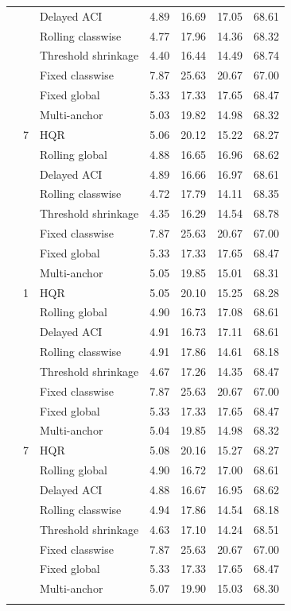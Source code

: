 \begin{table}[p]
\begin{tabular}{rrlrrrr}
 &  & Delayed ACI & 4.89 & 16.69 & 17.05 & 68.61 \\
 &  & Rolling classwise & 4.77 & 17.96 & 14.36 & 68.32 \\
 &  & Threshold shrinkage & 4.40 & 16.44 & 14.49 & 68.74 \\
 &  & Fixed classwise & 7.87 & 25.63 & 20.67 & 67.00 \\
 &  & Fixed global & 5.33 & 17.33 & 17.65 & 68.47 \\
 &  & Multi-anchor & 5.03 & 19.82 & 14.98 & 68.32 \\
\addlinespace
128 & 7 & HQR & 5.06 & 20.12 & 15.22 & 68.27 \\
 &  & Rolling global & 4.88 & 16.65 & 16.96 & 68.62 \\
 &  & Delayed ACI & 4.89 & 16.66 & 16.97 & 68.61 \\
 &  & Rolling classwise & 4.72 & 17.79 & 14.11 & 68.35 \\
 &  & Threshold shrinkage & 4.35 & 16.29 & 14.54 & 68.78 \\
 &  & Fixed classwise & 7.87 & 25.63 & 20.67 & 67.00 \\
 &  & Fixed global & 5.33 & 17.33 & 17.65 & 68.47 \\
 &  & Multi-anchor & 5.05 & 19.85 & 15.01 & 68.31 \\
\addlinespace
512 & 1 & HQR & 5.05 & 20.10 & 15.25 & 68.28 \\
 &  & Rolling global & 4.90 & 16.73 & 17.08 & 68.61 \\
 &  & Delayed ACI & 4.91 & 16.73 & 17.11 & 68.61 \\
 &  & Rolling classwise & 4.91 & 17.86 & 14.61 & 68.18 \\
 &  & Threshold shrinkage & 4.67 & 17.26 & 14.35 & 68.47 \\
 &  & Fixed classwise & 7.87 & 25.63 & 20.67 & 67.00 \\
 &  & Fixed global & 5.33 & 17.33 & 17.65 & 68.47 \\
 &  & Multi-anchor & 5.04 & 19.85 & 14.98 & 68.32 \\
\addlinespace
512 & 7 & HQR & 5.08 & 20.16 & 15.27 & 68.27 \\
 &  & Rolling global & 4.90 & 16.72 & 17.00 & 68.61 \\
 &  & Delayed ACI & 4.88 & 16.67 & 16.95 & 68.62 \\
 &  & Rolling classwise & 4.94 & 17.86 & 14.54 & 68.18 \\
 &  & Threshold shrinkage & 4.63 & 17.10 & 14.24 & 68.51 \\
 &  & Fixed classwise & 7.87 & 25.63 & 20.67 & 67.00 \\
 &  & Fixed global & 5.33 & 17.33 & 17.65 & 68.47 \\
 &  & Multi-anchor & 5.07 & 19.90 & 15.03 & 68.30 \\
\addlinespace
\bottomrule
\end{tabular}
\end{table}
